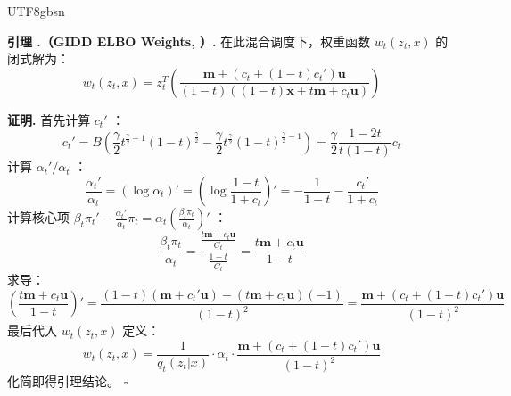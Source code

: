 \documentclass[11pt,a4paper]{article}
\newcounter{lemma}[section]
\renewcommand{\thelemma}{\thesection.\arabic{lemma}}
\begin{document}
\begin{CJK}{UTF8}{gbsn}
\begin{lembox}
\textbf{引理 \thelemma（GIDD ELBO Weights, ）.}
在此混合调度下，权重函数 $w_t(z_t, x)$ 的闭式解为：
\[
w_t(z_t, x) = z_t^T \left( \frac{\mathbf{m} + (c_t + (1-t)c_t')\mathbf{u}}{(1-t)((1-t)\mathbf{x} + t\mathbf{m} + c_t\mathbf{u})} \right)
\]
\end{lembox}

\textbf{证明.}
首先计算 $c_t'$ ：
\[
c_t' = B \left(\frac{\gamma}{2} t^{\frac{\gamma}{2}-1}(1-t)^{\frac{\gamma}{2}} - \frac{\gamma}{2} t^{\frac{\gamma}{2}}(1-t)^{\frac{\gamma}{2}-1}\right) = \frac{\gamma}{2} \frac{1-2t}{t(1-t)} c_t
\]
计算 $\alpha_t'/\alpha_t$ ：
\[
\frac{\alpha_t'}{\alpha_t} = (\log \alpha_t)' = \left(\log \frac{1-t}{1+c_t}\right)' = -\frac{1}{1-t} - \frac{c_t'}{1+c_t}
\]
计算核心项 $\beta_t \pi_t' - \frac{\alpha_t'}{\alpha_t}\pi_t = \alpha_t (\frac{\beta_t \pi_t}{\alpha_t})'$ ：
\[
\frac{\beta_t \pi_t}{\alpha_t} = \frac{\frac{t\mathbf{m} + c_t\mathbf{u}}{C_t}}{\frac{1-t}{C_t}} = \frac{t\mathbf{m} + c_t\mathbf{u}}{1-t}
\]
求导：
\[
\left(\frac{t\mathbf{m} + c_t\mathbf{u}}{1-t}\right)' = \frac{(1-t)(\mathbf{m}+c_t'\mathbf{u}) - (t\mathbf{m}+c_t\mathbf{u})(-1)}{(1-t)^2} = \frac{\mathbf{m} + (c_t + (1-t)c_t')\mathbf{u}}{(1-t)^2}
\]
最后代入 $w_t(z_t, x)$ 定义：
\[
w_t(z_t, x) = \frac{1}{q_t(z_t|x)} \cdot \alpha_t \cdot \frac{\mathbf{m} + (c_t + (1-t)c_t')\mathbf{u}}{(1-t)^2}
\]
化简即得引理结论。 \hfill $\square$

\end{CJK}
\end{document}
